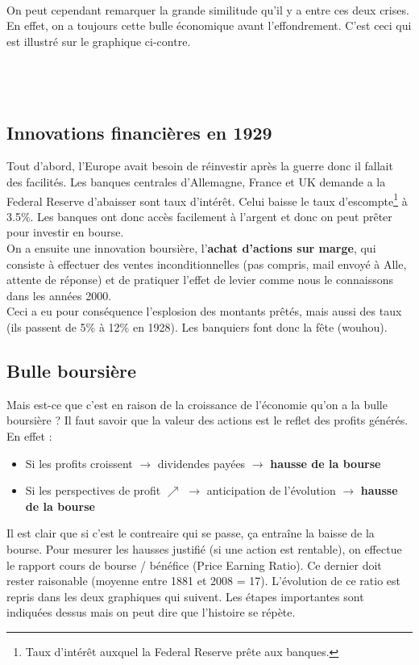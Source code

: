 \ \\ On peut cependant remarquer la grande similitude qu'il y a entre ces deux crises. En effet, on a toujours cette bulle économique avant l'effondrement. C'est ceci qui est illustré sur le graphique ci-contre. \\\\\\\\

\subsection{Innovations financières en 1929}
Tout d'abord, l'Europe avait besoin de réinvestir après la guerre donc il fallait des facilités. Les banques centrales d'Allemagne, France et UK demande a la Federal Reserve d'abaisser sont taux d'intérêt. Celui baisse le taux d'escompte\footnote{Taux d'intérêt auxquel la Federal Reserve prête aux banques.} à 3.5\%. Les banques ont donc accès facilement à l'argent et donc on peut prêter pour investir en bourse. \\
On a ensuite une innovation boursière, l'\textbf{achat d'actions sur marge}, qui consiste à effectuer des ventes inconditionnelles (pas compris, mail envoyé à Alle, attente de réponse) et de pratiquer l'effet de levier comme nous le connaissons dans les années 2000. \\
Ceci a eu pour conséquence l'esplosion des montants prêtés, mais aussi des taux (ils passent de 5\% à 12\% en 1928). Les banquiers font donc la fête (wouhou). 

\subsection{Bulle boursière}
Mais est-ce que c'est en raison de la croissance de l'économie qu'on a la bulle boursière ? Il faut savoir que la valeur des actions est le reflet des profits générés. En effet :

\begin{itemize}
	\item Si les profits croissent $\rightarrow$ dividendes payées $\rightarrow$ \textbf{hausse de la bourse}
	      	
	\item Si les perspectives de profit $\nearrow$ $\rightarrow$ anticipation de l'évolution $\rightarrow$ \textbf{hausse de la bourse}
\end{itemize}

Il est clair que si c'est le contreaire qui se passe, ça entraîne la baisse de la bourse. Pour mesurer les hausses justifié (si une action est rentable), on effectue le rapport cours de bourse / bénéfice (Price Earning Ratio). Ce dernier doit rester raisonable (moyenne entre 1881 et 2008 = 17). L'évolution de ce ratio est repris dans les deux graphiques qui suivent. Les étapes importantes sont indiquées dessus mais on peut dire que l'histoire se répète. \\

